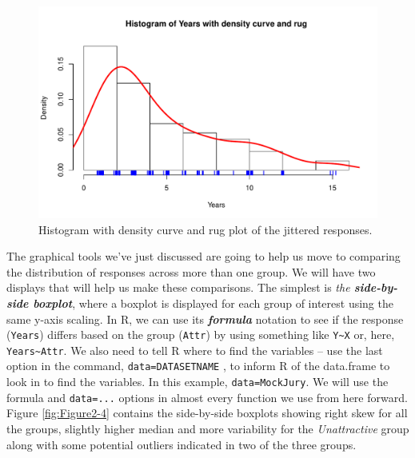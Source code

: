 \documentclass[]{book}
\theoremstyle{definition}
\theoremstyle{definition}
\theoremstyle{remark}
\begin{document}
\begin{figure}
\centering
\includegraphics{02-reintroductionToStatistics_files/figure-latex/Figure2-3-1.pdf}
\caption{\label{fig:Figure2-3}Histogram with density curve and rug plot of the jittered
responses.}
\end{figure}

The graphical tools we've just discussed are going to help us move to
comparing the distribution of responses across more than one group. We
will have two displays that will help us make these comparisons. The
simplest is \emph{the \textbf{side-by-side boxplot}}, where a boxplot is
displayed for each group of interest using the same y-axis scaling. In
R, we can use its \textbf{\emph{formula}} notation to see if the
response (\texttt{Years}) differs based on the group (\texttt{Attr}) by
using something like \texttt{Y\textasciitilde{}X} or, here,
\texttt{Years\textasciitilde{}Attr}. We also need to tell R where to
find the variables -- use the last option in the command,
\texttt{data=DATASETNAME} , to inform R of the data.frame to look in to
find the variables. In this example, \texttt{data=MockJury}. We will use
the formula and \texttt{data=...} options in almost every function we
use from here forward. Figure \ref{fig:Figure2-4} contains the
side-by-side boxplots showing right skew for all the groups, slightly
higher median and more variability for the \emph{Unattractive} group
along with some potential outliers indicated in two of the three groups.
\end{document}
